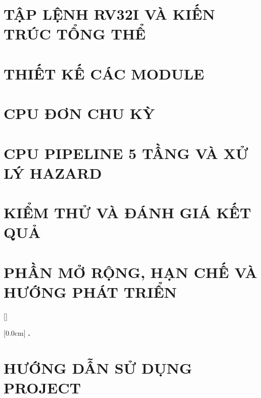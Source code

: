 \documentclass[a4paper,oneside]{report}
\theoremstyle{definition}
\begin{document}
\chapter{TẬP LỆNH RV32I VÀ KIẾN TRÚC TỔNG THỂ}
\label{ch:arch}


\chapter{THIẾT KẾ CÁC MODULE}
\label{ch:module}


\chapter{CPU ĐƠN CHU KỲ}
\label{ch:single}


\chapter{CPU PIPELINE 5 TẦNG VÀ XỬ LÝ HAZARD}
\label{ch:pipe}


\chapter{KIỂM THỬ VÀ ĐÁNH GIÁ KẾT QUẢ}
\label{ch:test}



\chapter{PHẦN MỞ RỘNG, HẠN CHẾ VÀ HƯỚNG PHÁT TRIỂN}
\label{ch:ext}


\newpage
\renewcommand\bibname{TÀI LIỆU THAM KHẢO}
\printbibliography

\appendixpage
\appendices
\addappheadtotoc

[]
\titlespacing*{\chapter}{0pt}{-20pt}{20pt}

    [0.0cm]             %
    {\bfseries\vspace{0.3cm}}                  %
    {{\bfseries{\scshape} \thecontentslabel.\ }} %
    {}         %
    {\contentspage}         %
\chapter{HƯỚNG DẪN SỬ DỤNG PROJECT}
\label{app:guide}

\end{document}
